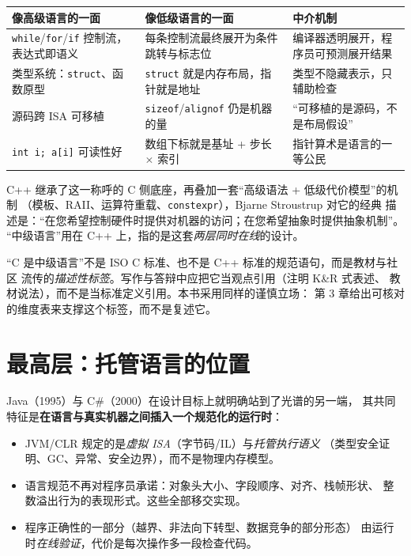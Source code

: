 \documentclass[12pt,a4paper,fontset=fandol]{ctexbook}
\begin{document}
\begin{longtable}{@{}>{\raggedright\arraybackslash}p{}>{\raggedright\arraybackslash}p{}>{\raggedright\arraybackslash}p{}@{}}
\toprule
\textbf{像高级语言的一面} & \textbf{像低级语言的一面} & \textbf{中介机制} \\
\midrule
\texttt{while}/\allowbreak{}\texttt{for}/\allowbreak{}\texttt{if} 控制流，表达式即语义 &
每条控制流最终展开为条件跳转与标志位 &
编译器透明展开，程序员可预测展开结果 \\
\addlinespace
类型系统：\texttt{struct}、函数原型 &
\texttt{struct} 就是内存布局，指针就是地址 &
类型不隐藏表示，只辅助检查 \\
\addlinespace
源码跨 ISA 可移植 &
\texttt{sizeof}/\allowbreak{}\texttt{alignof} 仍是机器的量 &
``可移植的是源码，不是布局假设'' \\
\addlinespace
\texttt{int i; a[i]} 可读性好 &
数组下标就是基址 + 步长 $\times$ 索引 &
指针算术是语言的一等公民 \\
\bottomrule
\end{longtable}

C++ 继承了这一称呼的 C 侧底座，再叠加一套``高级语法 + 低级代价模型''的机制
（模板、RAII、运算符重载、\texttt{constexpr}），Bjarne Stroustrup 对它的经典
描述是：``在您希望控制硬件时提供对机器的访问；在您希望抽象时提供抽象机制''。
``中级语言''用在 C++ 上，指的是这套\emph{两层同时在线}的设计。

\begin{warning}[title=引用规范提醒]
``C 是中级语言''不是 ISO C 标准、也不是 C++ 标准的规范语句，而是教材与社区
流传的\emph{描述性标签}。写作与答辩中应把它当观点引用（注明 K\&R 式表述、
教材说法），而不是当标准定义引用。本书采用同样的谨慎立场：
第 3 章给出可核对的维度表来支撑这个标签，而不是复述它。
\end{warning}

\section{最高层：托管语言的位置}

Java（1995）与 C\#（2000）在设计目标上就明确站到了光谱的另一端，
其共同特征是\textbf{在语言与真实机器之间插入一个规范化的运行时}：

\begin{itemize}
  \item JVM/CLR 规定的是\emph{虚拟 ISA}（字节码/IL）与\emph{托管执行语义}
        （类型安全证明、GC、异常、安全边界），而不是物理内存模型。
  \item 语言规范不再对程序员承诺：对象头大小、字段顺序、对齐、栈帧形状、
        整数溢出行为的表现形式。这些全部移交实现。
  \item 程序正确性的一部分（越界、非法向下转型、数据竞争的部分形态）
        由运行时\emph{在线验证}，代价是每次操作多一段检查代码。
\end{itemize}
\end{document}
